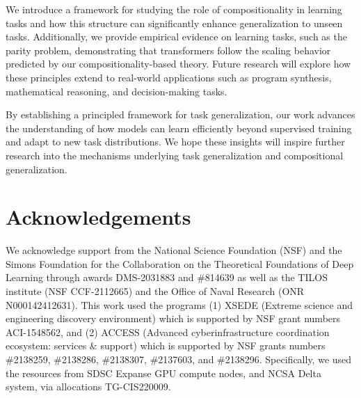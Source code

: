 We introduce a framework for studying the role of compositionality in learning tasks and how this structure can significantly enhance generalization to unseen tasks. Additionally, we provide empirical evidence on learning tasks, such as the parity problem, demonstrating that transformers follow the scaling behavior predicted by our compositionality-based theory. Future research will  explore how these principles extend to real-world applications such as program synthesis, mathematical reasoning, and decision-making tasks. 


By establishing a principled framework for task generalization, our work advances the understanding of how models can learn efficiently beyond supervised training and adapt to new task distributions. We hope these insights will inspire further research into the mechanisms underlying task generalization and compositional generalization.

\section*{Acknowledgements}
We acknowledge support from the National Science Foundation (NSF) and the Simons Foundation for the Collaboration on the Theoretical Foundations of Deep Learning through awards DMS-2031883 and \#814639 as well as the  TILOS institute (NSF CCF-2112665) and the Office of Naval Research (ONR N000142412631). 
This work used the programs (1) XSEDE (Extreme science and engineering discovery environment)  which is supported by NSF grant numbers ACI-1548562, and (2) ACCESS (Advanced cyberinfrastructure coordination ecosystem: services \& support) which is supported by NSF grants numbers \#2138259, \#2138286, \#2138307, \#2137603, and \#2138296. Specifically, we used the resources from SDSC Expanse GPU compute nodes, and NCSA Delta system, via allocations TG-CIS220009. 
